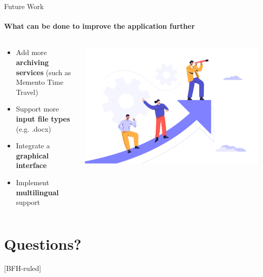 \documentclass[
    ngerman,%
    authorontitle=true,
]{bfhbeamer}
\begin{document}
    \begin{frame}{Future Work}
        \framesubtitle{What can be done to improve the application further}
        \begin{columns} %
            \begin{column}{0.5\textwidth} %
                \begin{itemize}
                    \item Add more \textbf{archiving services} (such as Memento Time Travel)
                    \item Support more \textbf{input file types} (e.g. .docx)
                    \item Integrate a \textbf{graphical interface}
                    \item Implement \textbf{multilingual} support
                \end{itemize}
            \end{column}
            \begin{column}{0.3\textwidth} %
                \begin{center}
                    \includegraphics[width=1\textwidth]{pictures/final_presentation/Business_team_2.jpg}
                \end{center}
            \end{column}
        \end{columns}
    \end{frame}

    \section{Questions?}
    [BFH-ruled]
    \frame{\sectionpage}
\end{document}
